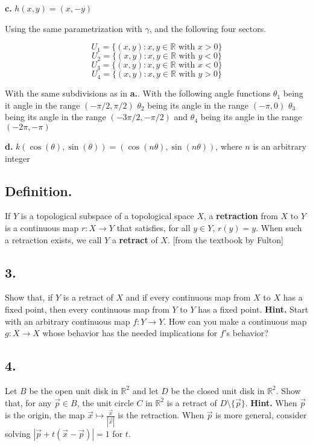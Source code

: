 \documentclass{amsart}
\theoremstyle{plain}
\theoremstyle{definition}
\theoremstyle{remark}
\begin{document}
\vspace{.1in}
{\bfseries c.} $h(x,y) = (x,-y)$


Using the same parametrization with $\gamma$, and the following four sectors. 


$$U_1=\{(x,y): x,y \in \mathbb R \text { with }x>0\}$$
$$U_2=\{(x,y): x,y \in \mathbb R \text { with }y<0\}$$
$$U_3=\{(x,y):x,y\in \mathbb R \text { with } x<0\}$$
$$U_4=\{(x,y):x,y\in \mathbb R \text { with }y>0\}$$

With the same subdivisions as in {\bfseries a.}. With the following angle functions $\theta_1$ being it angle in the range $(-\pi/2,\pi /2)$ $\theta_2$ being its angle in the range $( -\pi,0)$ $\theta_3$ being its angle in the range $(-3\pi/2,-\pi/2)$ and $\theta_4$ being its angle in the range $(-2\pi,-\pi)$



\vspace{.1in}
{\bfseries d.} $k(\cos (\theta ), \sin (\theta )) = (\cos (n\theta ), \sin (n\theta ))$, where $n$ is an arbitrary integer


\vspace{.15in}
\subsection*{Definition.}  If $Y$ is a topological subspace of a topological space $X$, a {\bf retraction} from $X$ to $Y$ is a continuous map $r : X \to Y$ that satisfies, for all $y\in Y$, $r(y) = y$. When such a retraction exists, we call $Y$ a {\bf retract} of $X$. [from the textbook by Fulton]

\vspace{.15in}
\noindent
\subsection*{3.} Show that, if $Y$ is a retract of $X$ and if every continuous map from $X$ to $X$ has a fixed point, then every continuous map from $Y$ to $Y$ has a fixed point. {\bf Hint.} Start with an arbitrary continuous map $f : Y\to Y$. How can you make a continuous map $g : X\to X$ whose behavior has the needed implications for $f$'s behavior?
 


\vspace{.15in}
\noindent
\subsection*{4.} Let $B$ be the open unit disk in $\mathbb R ^2$ and let $D$ be the closed unit disk in $\mathbb R ^2$. Show that, for any $\vec{p} \in B$, the unit circle $C$ in $\mathbb R ^2$ is a retract of $D\setminus \{ \vec{p}\}$. {\bf Hint.} When $\vec{p}$ is the origin, the map $\vec{x} \mapsto \frac{\vec{x}}{|\vec{x}|}$ is the retraction. When $\vec{p}$ is more general, consider solving $|\vec{p} + t(\vec{x}-\vec{p})| = 1$ for $t$. 
\end{document}

